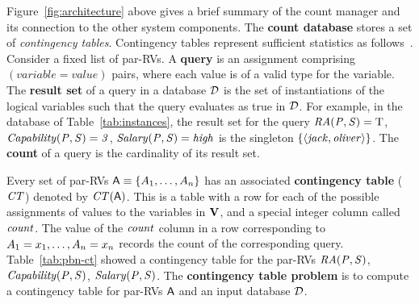 

Figure~\ref{fig:architecture} above gives a brief summary of the count manager and its connection to the other system components. The \textbf{count database} \CDB stores a set of  {\em contingency tables}. Contingency tables represent sufficient statistics as follows~\cite{Moore1998}. 
Consider a fixed list of par-RVs.
A \textbf{query} is an assignment comprising $(variable = value)$ pairs, where each value is of a valid type for the variable. 
The \textbf{result set} of a query in a database $\D$ is the set of instantiations of the logical variables such that the query evaluates as true in $\D$.
For example, in the database of  Table~\ref{tab:instances}, 
the result set for the query 
$\it{RA}(\P,\S) = \true$, $\it{Capability}(\P,\S) = 3$, $\it{Salary}(\P,\S) = \it{high} $ is
the singleton $\{\langle \it{jack}, \it{oliver}\rangle\}$. 
The \textbf{count} of a query is the cardinality of its result set. 

Every set of par-RVs $\parrvs \equiv \{\parrv_{1},\ldots,\parrv_{n} \}$ has an associated \textbf{contingency table} ($\cttable$) denoted by $\cttable(\parrvs)$. %
This is a table with a row for each of the possible assignments of values to the variables in $\set{V}$, and a special integer column called $\qcount$. 
The value of the $\qcount$ column in a row 
corresponding to $\parrv_{1} = x_{1},\ldots,\parrv_{n} = x_{n}$ records the count of the 
corresponding query. 
Table~\ref{tab:pbn-ct} showed a contingency table for the par-RVs $\it{RA}(\P,\S)$, $\it{Capability}(\P,\S)$, $\it{Salary}(\P,\S)$. The \textbf{contingency table problem} is to compute a contingency table for par-RVs $\parrvs$ and an input database $\D$. 
 
